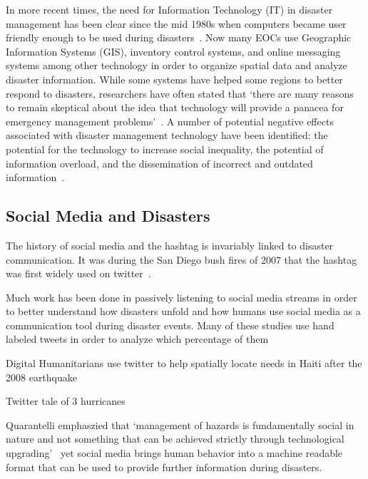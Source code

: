 In more recent times, the need for Information Technology (IT) in disaster
management has been clear since the mid 1980s when computers became user
friendly enough to be used during
disasters~\cite{universityTerminalDisastersComputer1986}. Now many EOCs use
Geographic Information Systems (GIS), inventory control systems, and online
messaging systems among other technology in order to organize spatial data and
analyze disaster information. While some systems have helped some regions to
better respond to disasters, researchers have often stated that `there
are many reasons to remain skeptical about the idea that technology will provide
a panacea for emergency management problems'~\cite{tzemosUseGISFederal1995,
tierneyFacingUnexpectedDisaster2001, perryNaturalDisasterManagement2007}. A
number of potential negative effects associated with disaster management
technology have been identified: the potential for the technology to increase
social inequality, the potential of information overload, and the dissemination
of incorrect and outdated information~\cite{quarantelliProblematicalAspectsInformation1997,
flentgeDesigningContextAwareHCI}.

\subsection{Social Media and Disasters}
The history of social media and the
hashtag is invariably linked to disaster communication.  It was during the San
Diego bush fires of 2007 that the hashtag was first widely used on
twitter~\cite{salazarHashtagsAnnotatedHistory2017}.

Much work has been done in passively listening to social media streams
in order to better understand how disasters unfold and how humans use
social media as a communication tool during disaster events. Many of
these studies use hand labeled tweets in order to analyze which
percentage of them 

Digital Humanitarians use twitter to help spatially locate needs in
Haiti after the 2008 earthquake~\cite{meierDigitalHumanitariansHow2015}

Twitter tale of 3 hurricanes~\cite{alamTwitterTaleThree2018}

Quarantelli emphaszied that  `management of hazards is fundamentally social in
nature and not something that can be achieved strictly through technological
upgrading'~\cite{tierneyFacingUnexpectedDisaster2001} yet social media brings
human behavior into a machine readable format that can be used to provide
further information during disasters.

